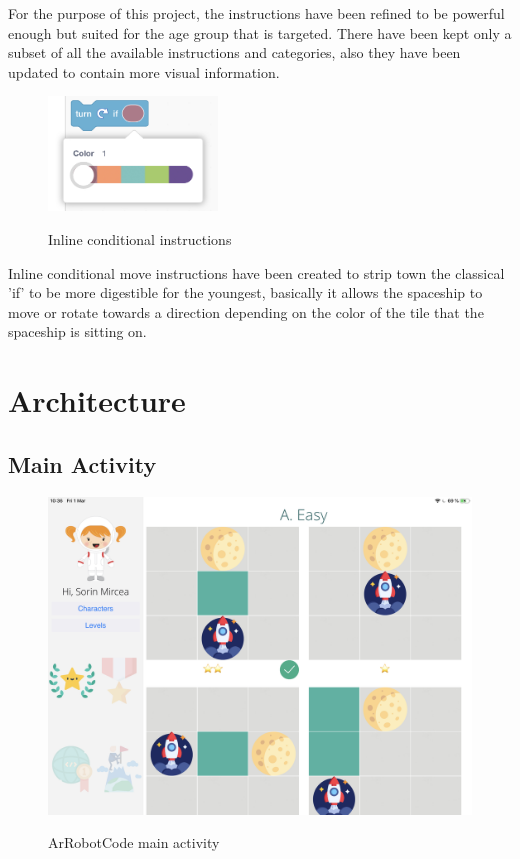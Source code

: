 \documentclass[12 pct]{report}
\begin{document}
For the purpose of this project, the instructions have been refined to be powerful enough but suited for the age group that is targeted. There have been kept only a subset of all the available instructions and categories, also they have been updated to contain more visual information. 

\begin{figure}[H]
\includegraphics[width=0.4\textwidth]{newIf}
\centering
\label{fig:hololens}
\caption{Inline conditional instructions}
\end{figure}

Inline conditional move instructions have been created to strip town the classical 'if'  to be more digestible for the youngest, basically it allows the spaceship to move or rotate towards a direction depending on the color of the tile that the spaceship is sitting on.
\section{Architecture}

\subsection*{Main Activity}
\begin{figure}[H]
\includegraphics[width=1.0\textwidth]{ArRobotCode0}
\centering
\label{fig:hololens}
\caption{ArRobotCode main activity}
\end{figure}
\end{document}
